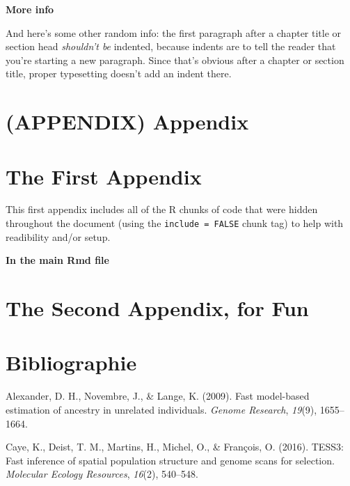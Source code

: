 \documentclass[12pt,twoside]{reedthesis}
\begin{document}
  \textbf{More info}
  
  And here's some other random info: the first paragraph after a chapter
  title or section head \emph{shouldn't be} indented, because indents are
  to tell the reader that you're starting a new paragraph. Since that's
  obvious after a chapter or section title, proper typesetting doesn't add
  an indent there.
  
  \chapter*{(APPENDIX) Appendix}\label{appendix-appendix}
  
  \chapter{The First Appendix}\label{the-first-appendix}
  
  This first appendix includes all of the R chunks of code that were
  hidden throughout the document (using the \texttt{include\ =\ FALSE}
  chunk tag) to help with readibility and/or setup.
  
  \textbf{In the main Rmd file}
  
  \chapter{The Second Appendix, for
  Fun}\label{the-second-appendix-for-fun}
  
  \backmatter
  
  \chapter*{Bibliographie}\label{bibliographie}
  
  \noindent
  
  \setlength{\parindent}{-0.20in} \setlength{\leftskip}{0.20in}
  \setlength{\parskip}{8pt}
  
  \hypertarget{refs}{}
  \hypertarget{ref-alexander2009fast}{}
  Alexander, D. H., Novembre, J., \& Lange, K. (2009). Fast model-based
  estimation of ancestry in unrelated individuals. \emph{Genome Research},
  \emph{19}(9), 1655--1664.
  
  \hypertarget{ref-caye2016tess3}{}
  Caye, K., Deist, T. M., Martins, H., Michel, O., \& François, O. (2016).
  TESS3: Fast inference of spatial population structure and genome scans
  for selection. \emph{Molecular Ecology Resources}, \emph{16}(2),
  540--548.
  
\end{document}
